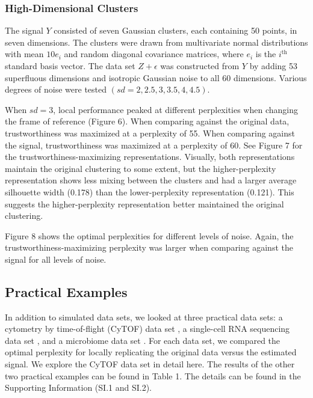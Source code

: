 \documentclass{article}
\begin{document}
\subsubsection{High-Dimensional Clusters}
The signal $Y$ consisted of seven Gaussian clusters, each containing 50 points, in seven dimensions. The clusters were drawn from multivariate normal distributions with mean $10e_i$ and random diagonal covariance matrices, where $e_i$ is the $i^\textrm{th}$ standard basis vector. The data set $Z + \epsilon$ was constructed from $Y$ by adding 53 superfluous dimensions and isotropic Gaussian noise to all 60 dimensions. Various degrees of noise were tested $(sd = 2, 2.5, 3, 3.5, 4, 4.5)$.

When $sd = 3$, local performance peaked at different perplexities when changing the frame of reference (Figure 6). When comparing against the original data, trustworthiness was maximized at a perplexity of 55. When comparing against the signal, trustworthiness was maximized at a perplexity of 60. See Figure 7 for the trustworthiness-maximizing representations. Visually, both representations maintain the original clustering to some extent, but the higher-perplexity representation shows less mixing between the clusters and had a larger average silhouette width (0.178) than the lower-perplexity representation (0.121). This suggests the higher-perplexity representation better maintained the original clustering.

Figure 8 shows the optimal perplexities for different levels of noise. Again, the trustworthiness-maximizing perplexity was larger when comparing against the signal for all levels of noise.

\subsection{Practical Examples}
In addition to simulated data sets, we looked at three practical data sets: a cytometry by time-of-flight (CyTOF) data set \cite{CyTOF data}, a single-cell RNA sequencing data set \cite{scRNA data}, and a microbiome data set \cite{enterotype data}. For each data set, we compared the optimal perplexity for locally replicating the original data versus the estimated signal. We explore the CyTOF data set in detail here. The results of the other two practical examples can be found in Table 1. The details can be found in the Supporting Information (SI.1 and SI.2).
\end{document}
